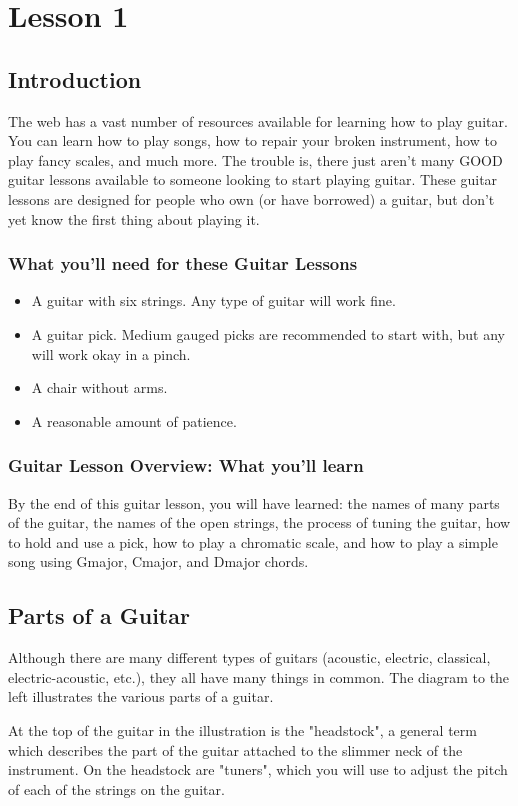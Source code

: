 \chapter{Lesson 1}
\section{Introduction}
The web has a vast number of resources available for learning how to play
guitar. You can learn how to play songs, how to repair your broken instrument,
how to play fancy scales, and much more. The trouble is, there just aren't many
GOOD guitar lessons available to someone looking to start playing guitar. These
guitar lessons are designed for people who own (or have borrowed) a guitar, but
don't yet know the first thing about playing it.

\subsection{What you'll need for these Guitar Lessons}
%
\begin{itemize}
\item A guitar with six strings. Any type of guitar will work fine.
\item A guitar pick. Medium gauged picks are recommended to start with, but any will work okay in a pinch.
\item A chair without arms.
\item A reasonable amount of patience.
\end{itemize}
%
\subsection{Guitar Lesson Overview: What you'll learn}
By the end of this guitar lesson, you will have learned: the names of many
parts of the guitar, the names of the open strings, the process of tuning the
guitar, how to hold and use a pick, how to play a chromatic scale, and how to
play a simple song using Gmajor, Cmajor, and Dmajor chords. 

\section{Parts of a Guitar}
Although there are many different types of guitars (acoustic, electric,
classical, electric-acoustic, etc.), they all have many things in common. The
diagram to the left illustrates the various parts of a guitar.

At the top of the guitar in the illustration is the "headstock", a general term
which describes the part of the guitar attached to the slimmer neck of the
instrument. On the headstock are "tuners", which you will use to adjust the
pitch of each of the strings on the guitar.


